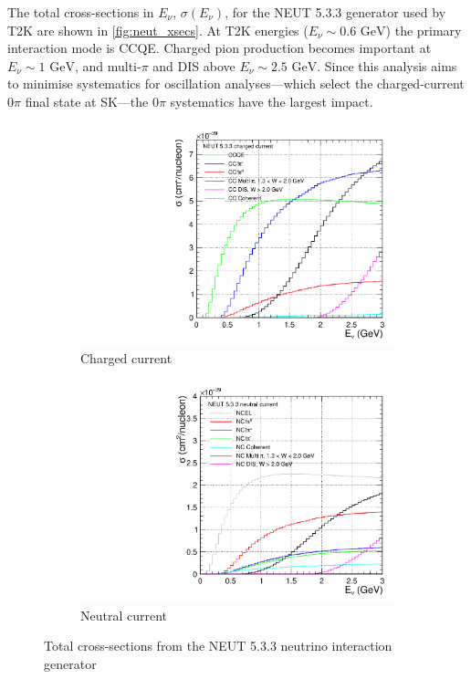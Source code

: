 The total cross-sections in $E_\nu$, $\sigma(E_\nu)$, for the NEUT 5.3.3\cite{neut} generator used by T2K are shown in \autoref{fig:neut_xsecs}. At T2K energies ($E_\nu\sim0.6\text{ GeV}$) the primary interaction mode is CCQE. Charged pion production becomes important at $E_\nu\sim1\text{ GeV}$, and multi-$\pi$ and DIS above $E_\nu\sim2.5\text{ GeV}$. Since this analysis aims to minimise systematics for oscillation analyses---which select the charged-current 0$\pi$ final state at SK---the 0$\pi$ systematics have the largest impact.
\begin{figure}[h]
	\centering
	\begin{subfigure}[t]{0.42\textwidth}
		\includegraphics[width=\textwidth, trim={0mm 0mm 0mm 0mm}, clip,page=1]{figures/niwg/NEUT_533_xsecs}
		\caption{Charged current}
	\end{subfigure}
	\begin{subfigure}[t]{0.42\textwidth}
		\includegraphics[width=\textwidth, trim={0mm 0mm 0mm 0mm}, clip,page=1]{figures/niwg/NEUT_533_xsecs_NC}
		\caption{Neutral current}
	\end{subfigure}
	\caption{Total cross-sections from the NEUT 5.3.3\cite{neut} neutrino interaction generator}
	\label{fig:neut_xsecs}
\end{figure}

